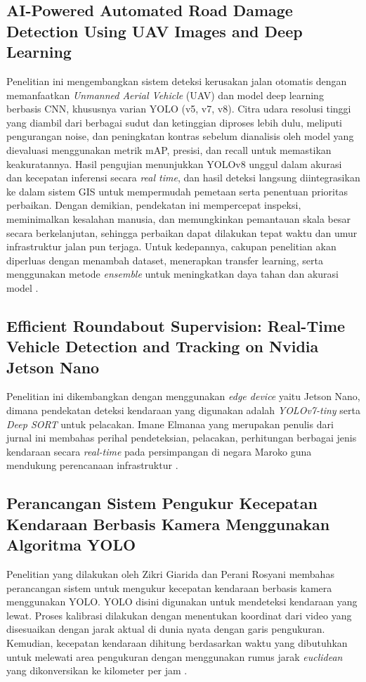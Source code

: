 \subsection{AI-Powered Automated Road Damage Detection Using UAV Images and Deep Learning}
Penelitian ini mengembangkan sistem deteksi kerusakan jalan otomatis dengan memanfaatkan \emph{Unmanned Aerial Vehicle} (UAV) dan model deep learning berbasis CNN, khususnya varian YOLO (v5, v7, v8). Citra udara resolusi tinggi yang diambil dari berbagai sudut dan ketinggian diproses lebih dulu, meliputi pengurangan noise, dan peningkatan kontras sebelum dianalisis oleh model yang dievaluasi menggunakan metrik mAP, presisi, dan recall untuk memastikan keakuratannya. Hasil pengujian menunjukkan YOLOv8 unggul dalam akurasi dan kecepatan inferensi secara \emph{real time}, dan hasil deteksi langsung diintegrasikan ke dalam sistem GIS untuk mempermudah pemetaan serta penentuan prioritas perbaikan. Dengan demikian, pendekatan ini mempercepat inspeksi, meminimalkan kesalahan manusia, dan memungkinkan pemantauan skala besar secara berkelanjutan, sehingga perbaikan dapat dilakukan tepat waktu dan umur infrastruktur jalan pun terjaga. Untuk kedepannya, cakupan penelitian akan diperluas dengan menambah dataset, menerapkan transfer learning, serta menggunakan metode \emph{ensemble} untuk meningkatkan daya tahan dan akurasi model \cite{bujji-ai}.

\subsection{Efficient Roundabout Supervision: Real-Time Vehicle Detection and Tracking on Nvidia Jetson Nano}
Penelitian ini dikembangkan dengan menggunakan \emph{edge device} yaitu Jetson Nano, dimana pendekatan deteksi kendaraan yang digunakan adalah \emph{YOLOv7-tiny} serta \emph{Deep SORT} untuk pelacakan. Imane Elmanaa yang merupakan penulis dari jurnal ini membahas perihal pendeteksian, pelacakan, perhitungan berbagai jenis kendaraan secara \emph{real-time} pada persimpangan di negara Maroko guna mendukung perencanaan infrastruktur \cite{efficient-roundabout-supervision}.

\subsection{Perancangan Sistem Pengukur Kecepatan Kendaraan Berbasis Kamera Menggunakan Algoritma YOLO}
Penelitian yang dilakukan oleh Zikri Giarida dan Perani Rosyani membahas perancangan sistem untuk mengukur kecepatan kendaraan berbasis kamera menggunakan YOLO. YOLO disini digunakan untuk mendeteksi kendaraan yang lewat. Proses kalibrasi dilakukan dengan menentukan koordinat dari video yang disesuaikan dengan jarak aktual di dunia nyata dengan garis pengukuran. Kemudian, kecepatan kendaraan dihitung berdasarkan waktu yang dibutuhkan untuk melewati area pengukuran dengan menggunakan rumus jarak \emph{euclidean} yang dikonversikan ke kilometer per jam \cite{perancangan-sistem-pengukur-kecepatan}.

